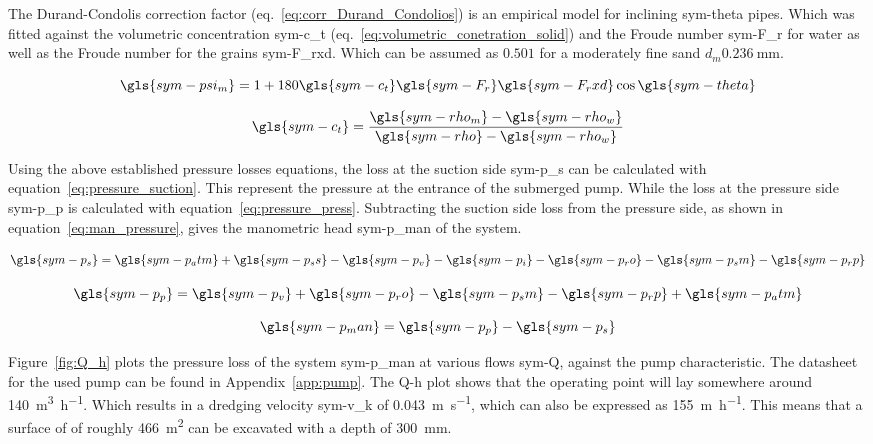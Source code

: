 \noindent The Durand-Condolis correction factor (eq.~\ref{eq:corr_Durand_Condolios}) is an empirical model for inclining
\gls{sym-theta} pipes. Which was fitted against the volumetric concentration \gls{sym-c_t}
(eq.~\ref{eq:volumetric_conetration_solid}) and the Froude number \gls{sym-F_r} for water as well as the Froude number
for the grains \gls{sym-F_rxd}. Which can be assumed as \( 0.501 \) for a moderately fine sand \(d_m
\SI{0.236}{\milli\meter} \).

\begin{equation}\label{eq:corr_Durand_Condolios}
	\gls{sym-psi_m} = 1 + 180 \gls{sym-c_t} \gls{sym-F_r} \gls{sym-F_rxd} \cos \gls{sym-theta}
\end{equation}

\begin{equation}\label{eq:volumetric_conetration_solid}
	\gls{sym-c_t} = \frac{\gls{sym-rho_m} - \gls{sym-rho_w}}{\gls{sym-rho} - \gls{sym-rho_w}}
\end{equation}

Using the above established pressure losses equations, the loss at the suction side \gls{sym-p_s} can be calculated with
equation~\ref{eq:pressure_suction}. This represent the pressure at the entrance of the submerged pump. While the loss at
the pressure side \gls{sym-p_p} is calculated with equation~\ref{eq:pressure_press}. Subtracting the suction side loss
from the pressure side, as shown in equation~\ref{eq:man_pressure}, gives the manometric head \gls{sym-p_man} of the
system.

\begin{equation}\label{eq:pressure_suction}
	\gls{sym-p_s} = \gls{sym-p_atm} + \gls{sym-p_ss} - \gls{sym-p_v} - \gls{sym-p_i} - \gls{sym-p_ro} - \gls{sym-p_sm} - \gls{sym-p_rp}
\end{equation}

\begin{equation}\label{eq:pressure_press}
	\gls{sym-p_p} = \gls{sym-p_v} + \gls{sym-p_ro} - \gls{sym-p_sm} - \gls{sym-p_rp} + \gls{sym-p_atm}
\end{equation}

\begin{equation}\label{eq:man_pressure}
	\gls{sym-p_man} = \gls{sym-p_p} - \gls{sym-p_s}
\end{equation}

Figure~\ref{fig:Q_h} plots the pressure loss of the system \gls{sym-p_man} at various flows \gls{sym-Q}, against the
pump characteristic. The datasheet for the used pump can be found in Appendix~\ref{app:pump}. The Q-h plot shows that
the operating point will lay somewhere around \SI{140}{\cubic\meter\per\hour}. Which results in a dredging velocity
\gls{sym-v_k} of \SI{0.043}{\meter\per\second}, which can also be expressed as \SI{155}{\meter\per\hour}. This means
that a surface of of roughly \SI{466}{\meter\squared} can be excavated with a depth of \SI{300}{\milli\meter}.

